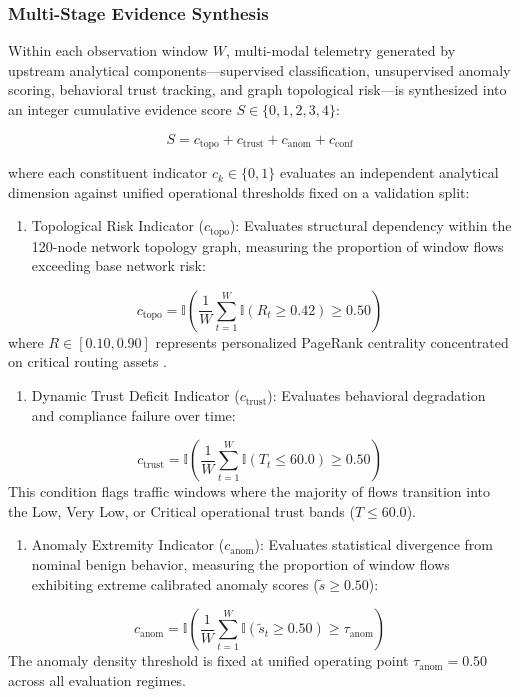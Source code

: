 \documentclass[journal,10pt,onecolumn]{IEEEtran}
\begin{document}
\subsubsection{Multi-Stage Evidence Synthesis}
Within each observation window $W$, multi-modal telemetry generated by upstream analytical components—supervised classification, unsupervised anomaly scoring, behavioral trust tracking, and graph topological risk—is synthesized into an integer cumulative evidence score $S \in \{0, 1, 2, 3, 4\}$:

$$S = c_{\text{topo}} + c_{\text{trust}} + c_{\text{anom}} + c_{\text{conf}}$$

where each constituent indicator $c_k \in \{0, 1\}$ evaluates an independent analytical dimension against unified operational thresholds fixed on a validation split:

\begin{enumerate}
  \item Topological Risk Indicator ($c_{\text{topo}}$): Evaluates structural dependency within the 120-node network topology graph, measuring the proportion of window flows exceeding base network risk:
\end{enumerate}
$$c_{\text{topo}} = \mathbb{I}\left(\frac{1}{W} \sum_{t=1}^W \mathbb{I}(R_t \ge 0.42) \ge 0.50\right)$$
where $R \in [0.10, 0.90]$ represents personalized PageRank centrality concentrated on critical routing assets \cite{12, 14}.

\begin{enumerate}
  \item Dynamic Trust Deficit Indicator ($c_{\text{trust}}$): Evaluates behavioral degradation and compliance failure over time:
\end{enumerate}
$$c_{\text{trust}} = \mathbb{I}\left(\frac{1}{W} \sum_{t=1}^W \mathbb{I}(T_t \le 60.0) \ge 0.50\right)$$
This condition flags traffic windows where the majority of flows transition into the Low, Very Low, or Critical operational trust bands ($T \le 60.0$).

\begin{enumerate}
  \item Anomaly Extremity Indicator ($c_{\text{anom}}$): Evaluates statistical divergence from nominal benign behavior, measuring the proportion of window flows exhibiting extreme calibrated anomaly scores ($\tilde{s} \ge 0.50$):
\end{enumerate}
$$c_{\text{anom}} = \mathbb{I}\left(\frac{1}{W} \sum_{t=1}^W \mathbb{I}(\tilde{s}_t \ge 0.50) \ge \tau_{\text{anom}}\right)$$
The anomaly density threshold is fixed at unified operating point $\tau_{\text{anom}} = 0.50$ across all evaluation regimes.
\end{document}
